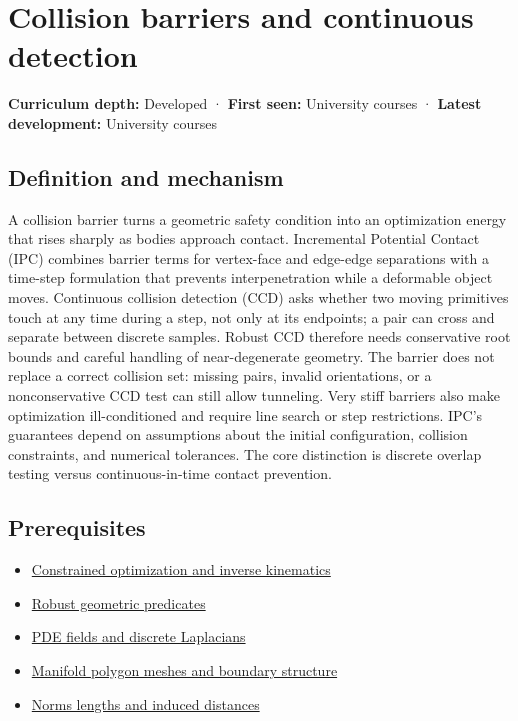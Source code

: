 \hypertarget{appendix-a9ba01fa72a6}{}\label{referencestart:appendix-a9ba01fa72a6}
\section{Collision barriers and continuous detection}\label{appendix-a9ba01fa72a6-collision-barriers-and-continuous-detection}

\textbf{Curriculum depth:} Developed · \textbf{First seen:} University courses · \textbf{Latest development:} University courses

\subsection{Definition and mechanism}\label{appendix-a9ba01fa72a6-definition-and-mechanism}

A collision barrier turns a geometric safety condition into an optimization energy that rises sharply as bodies approach contact. Incremental Potential Contact (IPC) combines barrier terms for vertex-face and edge-edge separations with a time-step formulation that prevents interpenetration while a deformable object moves. Continuous collision detection (CCD) asks whether two moving primitives touch at any time during a step, not only at its endpoints; a pair can cross and separate between discrete samples. Robust CCD therefore needs conservative root bounds and careful handling of near-degenerate geometry. The barrier does not replace a correct collision set: missing pairs, invalid orientations, or a nonconservative CCD test can still allow tunneling. Very stiff barriers also make optimization ill-conditioned and require line search or step restrictions. IPC's guarantees depend on assumptions about the initial configuration, collision constraints, and numerical tolerances. The core distinction is discrete overlap testing versus continuous-in-time contact prevention.

\subsection{Prerequisites}\label{appendix-a9ba01fa72a6-prerequisites}

\begin{itemize}
\tightlist
\item
  \hyperref[appendix-29f4bea4c2bb]{Constrained optimization and inverse kinematics}
\item
  \hyperref[appendix-341296fb3f64]{Robust geometric predicates}
\item
  \hyperref[appendix-1988d465c119]{PDE fields and discrete Laplacians}
\item
  \hyperref[appendix-fab348609369]{Manifold polygon meshes and boundary structure}
\item
  \hyperref[appendix-49933872bb51]{Norms lengths and induced distances}
\end{itemize}

